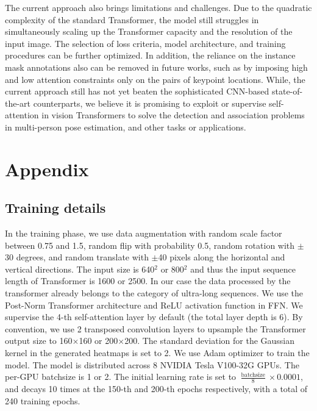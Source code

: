 \documentclass{article} \usepackage{iclr_conference,times}
\begin{document}
The current approach also brings limitations and challenges. 
Due to the quadratic complexity of the standard Transformer, the model still struggles in simultaneously scaling up the Transformer capacity and the resolution of the input image.
The selection of loss criteria, model architecture, and training procedures can be further optimized. In addition, the reliance on the instance mask annotations also can be removed in future works, such as by imposing high and low attention constraints only on the pairs of keypoint locations. While, the current approach still has not yet beaten the sophisticated CNN-based state-of-the-art counterparts, we believe it is promising to exploit or supervise self-attention in vision Transformers to solve the detection and association problems in multi-person pose estimation, and other tasks or applications.








\newpage
\appendix
\section{Appendix}



\subsection{Training details}
\label{Appendix}
In the training phase, we use data augmentation with random scale factor between 0.75 and 1.5, random flip with probability 0.5, random rotation with $\pm$30 degrees, and random translate with $\pm$40 pixels along the horizontal and vertical directions. The input size is 640$^2$ or 800$^2$ and thus the input sequence length of Transformer is 1600 or 2500. In our case the data processed by the transformer already belongs to the category of ultra-long sequences. We use the Post-Norm Transformer architecture and ReLU activation function in FFN. We supervise the 4-th self-attention layer by default (the total layer depth is 6). By convention, we use 2 transposed convolution layers to upsample the Transformer output size to 160$\times$160 or 200$\times$200. The standard deviation for the Gaussian kernel in the generated heatmaps is set to 2. We use Adam optimizer to train the model. The model is distributed across 8 NVIDIA Tesla V100-32G GPUs. The per-GPU batchsize is 1 or 2. The initial learning rate is set to $\frac{\operatorname{batchsize}}{8}\times 0.0001$, and decays 10 times at the 150-th and 200-th epochs respectively, with a total of 240 training epochs. 
\end{document}
